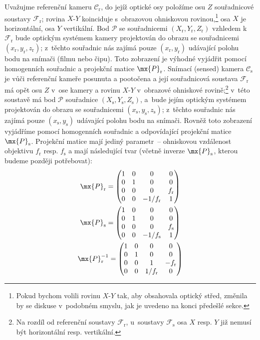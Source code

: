 Uvažujme referenční kameru $\mathcal{C}_{\mathrm{r}}$, do jejíž optické osy
položíme osu $Z$  souřadnicové soustavy
$\mathcal{F}_{\mathrm{r}}$; rovina $X$-$Y$ koinciduje s~obrazovou ohniskovou
rovinou,\footnote{Pokud bychom volili rovinu $X$-$Y$ tak, aby obsahovala
  optický střed, změnila by se diskuse v~podobném smyslu, jak je uvedeno na
  konci předešlé sekce.} osa $X$ je horizontální, osa $Y$ vertikální. Bod
$\mathcal{P}$ se  souřadnicemi
$(X_{\mathrm{r}}, Y_{\mathrm{r}}, Z_{\mathrm{r}})$ vzhledem k
$\mathcal{F}_{\mathrm{r}}$ bude optickým systémem kamery projektován do obrazu
se souřadnicemi $(x_{\mathrm{r}}, y_{\mathrm{r}}, z_{\mathrm{r}})$; z~těchto
souřadnic nás zajímá pouze $(x_{\mathrm{r}}, y_{\mathrm{r}})$ udávající polohu
bodu na snímači (filmu nebo čipu). Toto zobrazení je výhodné vyjádřit pomocí
homogenních souřadnic a projekční matice $\mx{P}_{\mathrm{r}}$. Snímací
(sensed) kamera $\mathcal{C}_{\mathrm{s}}$ je vůči referenční kameře posunuta
a pootočena a její  souřadnicová soustava
$\mathcal{F}_{\mathrm{r}}$ má opět osu $Z$ v~ose kamery a rovinu $X$-$Y$
v~obrazové ohniskové rovině;\footnote{Na rozdíl od referenční soustavy
  $\mathcal{F}_{\mathrm{r}}$, u~soustavy $\mathcal{F}_{\mathrm{s}}$ osa $X$
  resp. $Y$ již nemusí být horizontální resp. vertikální.} v~této soustavě má
bod $\mathcal{P}$ souřadnice
$(X_{\mathrm{s}}, Y_{\mathrm{s}}, Z_{\mathrm{s}})$, a~bude jejím optickým
systémem projektován do obrazu se souřadnicemi
$(x_{\mathrm{s}}, y_{\mathrm{s}}, z_{\mathrm{s}})$; z~těchto souřadnic nás
zajímá pouze $(x_{\mathrm{s}}, y_{\mathrm{s}})$ udávající polohu bodu na
snímači. Rovněž toto zobrazení vyjádříme pomocí homogenních souřadnic a
odpovídající projekční matice $\mx{P}_{\mathrm{s}}$. Projekční matice mají
jediný parametr~-- ohniskovou vzdálenost objektivu $f_{\mathrm{r}}$
resp. $f_{\mathrm{s}}$ a mají následující tvar (včetně inverze
$\mx{P}_{\mathrm{s}}$, kterou budeme později potřebovat):
\begin{gather}
  \mx{P}_{\mathrm{r}}=
  \begin{pmatrix}
    1&0&0&0\\0&1&0&0\\0&0&0&f_{\mathrm{r}}\\0&0&-1/f_{\mathrm{r}}&1
  \end{pmatrix}                                                \label{EQprojr}\\
  \mx{P}_{\mathrm{s}}=
  \begin{pmatrix}
    1&0&0&0\\0&1&0&0\\0&0&0&f_{\mathrm{s}}\\0&0&-1/f_{\mathrm{s}}&1
  \end{pmatrix}                                                \label{EQprojs}\\
  \mx{P}_{\mathrm{r}}^{-1}=
  \begin{pmatrix}
    1&0&0&0\\0&1&0&0\\0&0&1&-f_{\mathrm{r}}\\0&0&1/f_{\mathrm{r}}&0
  \end{pmatrix}                                                 \label{EQprojir}
\end{gather}

